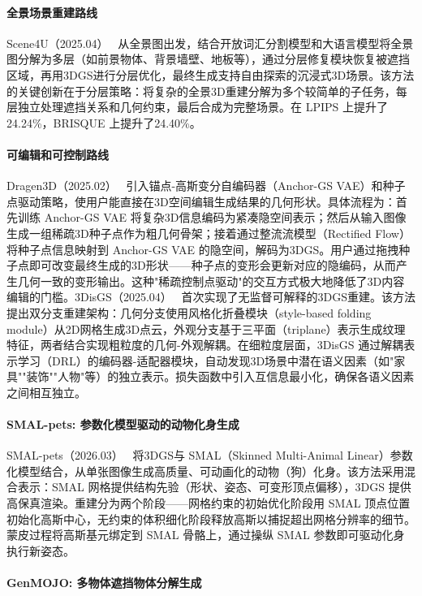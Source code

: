 \paragraph{全景场景重建路线} Scene4U（2025.04）~\cite{2504_00387} 从全景图出发，结合开放词汇分割模型和大语言模型将全景图分解为多层（如前景物体、背景墙壁、地板等），通过分层修复模块恢复被遮挡区域，再用3DGS进行分层优化，最终生成支持自由探索的沉浸式3D场景。该方法的关键创新在于分层策略：将复杂的全景3D重建分解为多个较简单的子任务，每层独立处理遮挡关系和几何约束，最后合成为完整场景。在 LPIPS 上提升了24.24\%，BRISQUE 上提升了24.40\%。

\paragraph{可编辑和可控制路线} Dragen3D（2025.02）~\cite{2502_16475} 引入锚点-高斯变分自编码器（Anchor-GS VAE）和种子点驱动策略，使用户能直接在3D空间编辑生成结果的几何形状。具体流程为：首先训练 Anchor-GS VAE 将复杂3D信息编码为紧凑隐空间表示；然后从输入图像生成一组稀疏3D种子点作为粗几何骨架；接着通过整流流模型（Rectified Flow）将种子点信息映射到 Anchor-GS VAE 的隐空间，解码为3DGS。用户通过拖拽种子点即可改变最终生成的3D形状——种子点的变形会更新对应的隐编码，从而产生几何一致的变形输出。这种"稀疏控制点驱动"的交互方式极大地降低了3D内容编辑的门槛。3DisGS（2025.04）~\cite{2504_04190} 首次实现了无监督可解释的3DGS重建。该方法提出双分支重建架构：几何分支使用风格化折叠模块（style-based folding module）从2D网格生成3D点云，外观分支基于三平面（triplane）表示生成纹理特征，两者结合实现粗粒度的几何-外观解耦。在细粒度层面，3DisGS 通过解耦表示学习（DRL）的编码器-适配器模块，自动发现3D场景中潜在语义因素（如"家具""装饰""人物"等）的独立表示。损失函数中引入互信息最小化，确保各语义因素之间相互独立。

\paragraph{SMAL-pets: 参数化模型驱动的动物化身生成}

SMAL-pets（2026.03）~\cite{2603_17131} 将3DGS与 SMAL（Skinned Multi-Animal Linear）参数化模型结合，从单张图像生成高质量、可动画化的动物（狗）化身。该方法采用混合表示：SMAL 网格提供结构先验（形状、姿态、可变形顶点偏移），3DGS 提供高保真渲染。重建分为两个阶段——网格约束的初始优化阶段用 SMAL 顶点位置初始化高斯中心，无约束的体积细化阶段释放高斯以捕捉超出网格分辨率的细节。蒙皮过程将高斯基元绑定到 SMAL 骨骼上，通过操纵 SMAL 参数即可驱动化身执行新姿态。

\paragraph{GenMOJO: 多物体遮挡物体分解生成}

